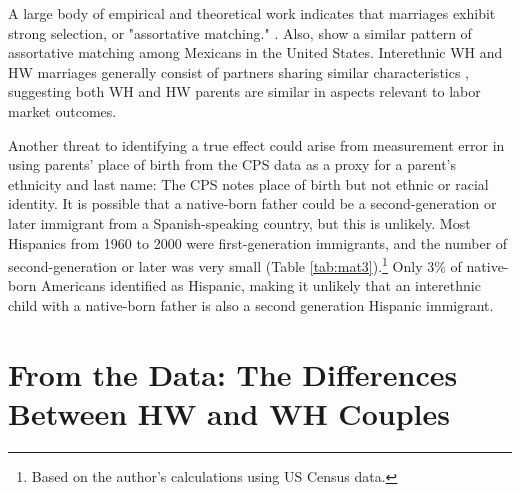 
A large body of empirical and theoretical work indicates that marriages exhibit strong selection, or "assortative matching." \autocite{averettBetterWorseRelationship2008, averettEconomicRealityBeauty1996, beckerTheoryMarriagePart1973, beckerTheoryMarriagePart1974, beckerTreatiseFamily1993, browningCollectiveUnitaryModels2006, chiapporiFatterAttractionAnthropometric2012}. Also, \textcite{duncanIntermarriageIntergenerationalTransmission2011} show a similar pattern of assortative matching among Mexicans in the United States. Interethnic WH and HW marriages generally consist of partners sharing similar characteristics , suggesting both WH and HW parents are similar in aspects relevant to labor market outcomes.

Another threat to identifying a true effect could arise from measurement error in using parents’ place of birth from the CPS data as a proxy for a parent’s ethnicity and last name: The CPS notes place of birth but not ethnic or racial identity. It is possible that a native-born father could be a second-generation or later immigrant from a Spanish-speaking country, but this is unlikely. Most Hispanics from 1960 to 2000  were first-generation immigrants, and the number of second-generation or later was very small (Table \ref{tab:mat3}).\footnote{Based on the author's calculations using US Census data.} Only 3\% of native-born Americans identified as Hispanic, making it unlikely that an interethnic child with a native-born father is also a second generation Hispanic immigrant. 

\section{From the Data: The Differences Between HW and WH Couples}\label{sec:hw-wh-couples-data}

